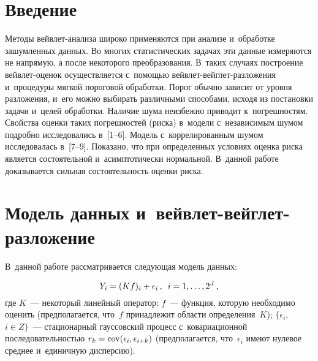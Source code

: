 
\vspace*{-8pt}




\thispagestyle{headings}

\begin{multicols}{2}

\label{st\stat}


\section{Введение}

 \vspace*{-4pt}

Методы вейвлет-анализа широко применяются при анализе и~обработке зашумленных данных. 
Во многих статистических задачах эти данные измеряются не напрямую, а после некоторого 
преобразования. В~таких случаях построение вейв\-лет-оце\-нок осуществляется с~по\-мощью 
вейв\-лет-вейг\-лет-раз\-ло\-же\-ния и~процедуры мягкой пороговой обработки. Порог 
обычно зависит от уровня разложения, и~его можно выбирать различными способами,
 исходя из постановки задачи и~целей обработки. Наличие шума неизбежно 
 приводит к~погрешностям. Свойства оценки таких погрешностей 
 (риска) в~модели с~независимым шумом подробно исследовались в~[1--6]. 
 Модель с~коррелированным шумом исследовалась в~[7--9]. Показано, что при 
 определенных условиях оценка риска является состоятельной и~асимптотически 
 нормальной. В~данной работе доказывается сильная состоятельность оценки риска.
 
 \vspace*{-6pt}

\section{Модель данных и~вейвлет-вейглет-разложение}

 \vspace*{-4pt}

В~данной работе рассматривается следующая модель данных:

\noindent
\begin{equation}
\label{Data_Model_Operator}
Y_i=(Kf)_i+\epsilon_i\,,\enskip i=1,\ldots, 2^J\,,
\end{equation}
где $K$~--- некоторый линейный оператор; $f$~--- 
функция, которую необходимо оценить (предполагается, что~$f$ 
принадлежит области определения~$K$); $\{\epsilon_i$, $i \in Z\}$~--- 
стационарный гауссовский процесс с~ковариационной последовательностью 
$r_k \hm= \cov(\epsilon_i,\epsilon_{i+k})$ 
(предполагается, что~$\epsilon_i$ имеют нулевое среднее и~единичную дисперсию). 


\end{multicols}
